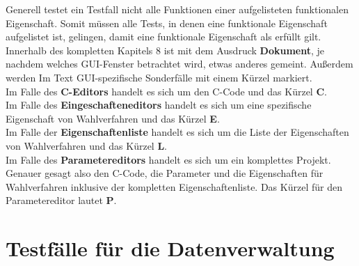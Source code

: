 \documentclass[a4paper]{scrreprt}
\begin{document}
Generell testet ein Testfall nicht alle Funktionen einer aufgelisteten funktionalen Eigenschaft. Somit müssen alle Tests, in denen eine funktionale Eigenschaft aufgelistet ist, gelingen, damit eine funktionale Eigenschaft als erfüllt gilt. \\
Innerhalb des kompletten Kapitels 8 ist mit dem Ausdruck \textbf{Dokument}, je nachdem welches \ac{GUI}-Fenster betrachtet wird, etwas anderes gemeint. Außerdem werden Im Text \ac{GUI}-spezifische Sonderfälle mit einem Kürzel markiert. \\
Im Falle des \textbf{C-Editors} handelt es sich um den C-Code und das Kürzel \textbf{C}. \\
Im Falle des \textbf{Eingeschafteneditors} handelt es sich um eine spezifische Eigenschaft von Wahlverfahren und das Kürzel \textbf{E}. \\
Im Falle der \textbf{Eigenschaftenliste} handelt es sich um die Liste der Eigenschaften von Wahlverfahren und das Kürzel \textbf{L}. \\
Im Falle des \textbf{Parametereditors} handelt es sich um ein komplettes Projekt. Genauer gesagt also den C-Code, die Parameter und die Eigenschaften für Wahlverfahren inklusive der kompletten Eigenschaftenliste. Das Kürzel für den Parametereditor lautet \textbf{P}. \\

\section{Testfälle für die Datenverwaltung}
\end{document}
